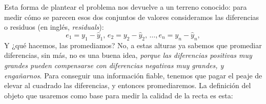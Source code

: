 Esta forma de plantear el problema nos devuelve a un terreno conocido: para medir cómo se parecen esos dos conjuntos de valores consideramos las diferencias o {\sf residuos} (en inglés, {\em residuals}):
\begin{equation}\label{cap10:ecu:ResiduosRegresionLineal}
e_1=y_1-\hat y_1,\, e_2=y_2-\hat y_2,\, \ldots, e_n=y_n-\hat y_n,
\end{equation}
Y ¿qué hacemos, las promediamos? No, a estas alturas ya sabemos que promediar diferencias,
sin más, no es una buena idea, {\em porque las diferencias positivas muy grandes pueden
compensarse con diferencias negativas muy grandes,  y engañarnos}. Para conseguir una
información fiable, tenemos que pagar el peaje de elevar al cuadrado las diferencias,
y entonces promediaremos. La definición del objeto que usaremos como base para medir la calidad de la recta es esta:
    \begin{center}
    \end{center}
